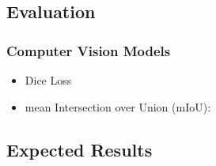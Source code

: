 \begin{multicols}{2}
\subsection{Evaluation}
    \subsubsection{Computer Vision Models}
        \begin{itemize}
            \item Dice Loss
            \item mean Intersection over Union (mIoU): 
        \end{itemize}

    
    

\subsection{Expected Results}


\end{multicols}
